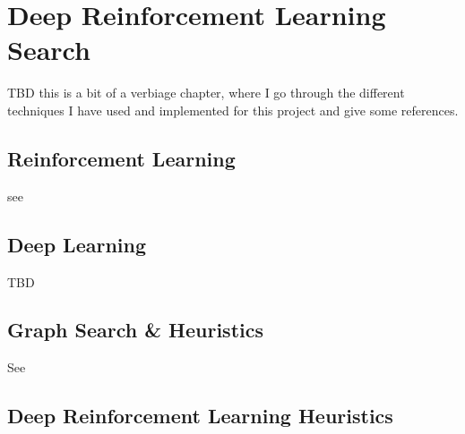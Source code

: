 
\chapter{Deep Reinforcement Learning Search} %

\label{Chapter1} %

TBD this is a bit of a verbiage chapter, where I go through the different techniques I have used and implemented for this project and give some references.


\section{Reinforcement Learning}

see \cite{Sutton1998}


\section{Deep Learning}

TBD


\section{Graph Search \& Heuristics}

\label{GSH}

See \cite{DBLP:journals/jacm/DechterP85}



\section{Deep Reinforcement Learning Heuristics}

